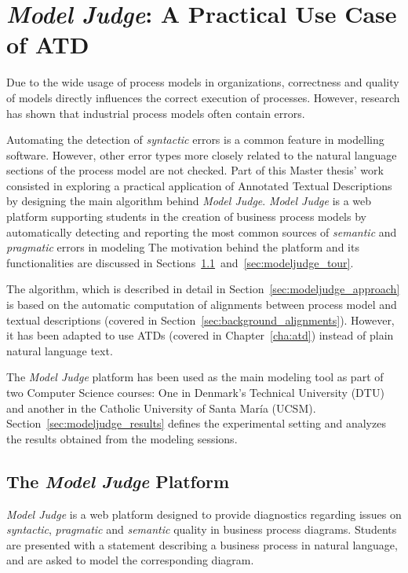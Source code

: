 \chapter{\emph{Model Judge}: A Practical Use Case of ATD}
\label{cha:modeljudge}

Due to the wide usage of process models in organizations, correctness and
quality of models directly influences the correct execution of processes.
However, research has shown that industrial process models often
contain errors\cite{citation needed}.

Automating the detection of \emph{syntactic} errors is a common feature in 
modelling software. However, other error types more closely related to the
natural language sections of the process model are not checked. Part of this
Master thesis' work consisted in exploring a practical application of Annotated
Textual Descriptions by designing the main algorithm behind \emph{Model
  Judge}\cite{citation needed}. \emph{Model Judge} is a web platform supporting
students in the creation of business process models by automatically detecting
and reporting the most common sources of \emph{semantic} and \emph{pragmatic}
errors in modeling The motivation behind the platform and its functionalities
are discussed in
Sections~\ref{sec:modeljudge_description}~and~\ref{sec:modeljudge_tour}.


The algorithm, which is described in detail in
Section~\ref{sec:modeljudge_approach} is based on the automatic computation of
alignments between process model and textual descriptions (covered in
Section~\ref{sec:background_alignments}). However, it has been adapted to use
ATDs (covered in Chapter~\ref{cha:atd}) instead of plain natural language text.

The \emph{Model Judge} platform has been used as the main modeling tool as
part of two Computer Science courses: One in Denmark's Technical University
(DTU) and another in the Catholic University of Santa Mar\'ia (UCSM).
Section~\ref{sec:modeljudge_results} defines the experimental setting and
analyzes the results obtained from the modeling sessions.

\section{The \emph{Model Judge} Platform}
\label{sec:modeljudge_description}
 


\emph{Model Judge} is a web platform designed to provide diagnostics regarding
issues on \emph{syntactic}, \emph{pragmatic} and \emph{semantic} quality in
business process diagrams. Students are presented with a statement describing a
business process in natural language, and are asked to model the corresponding
diagram.

